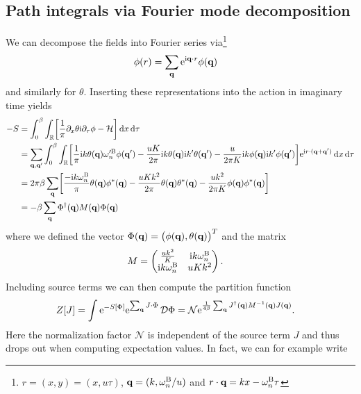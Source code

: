 \documentclass[english, parskip=full]{scrartcl}
\begin{document}
\subsection{Path integrals via Fourier mode decomposition}
We can decompose the fields into Fourier series via\footnote{$r=(x,y) = (x,u\tau)$, $\textbf{q} = (k,\omega_n^\B / u)$ and $r\cdot \textbf{q} = kx - \omega_n^\B \tau$}
\begin{align}
\phi(r) &= \sum_\textbf{q} \powe{\i \textbf{q}\cdot r} \phi(\textbf{q})
\end{align}
and similarly for $\theta$.
Inserting these representations into the action in imaginary time yields
\begin{align}
-S &= \intx{0}{\beta}{\intr{\klb*{\frac{1}{\pi} \partial_x\theta \i\partial_\tau\phi - \mathcal{H}}}{x} }{\tau}\\
&= \sum_{\textbf{q},\textbf{q}'} \intx{0}{\beta}{\intr{\klb*{\frac{1}{\pi} \i k\theta(\textbf{q}) \omega_n'^\B \phi(\textbf{q}') - \frac{uK}{2\pi} \i k\theta(\textbf{q}) \i k'\theta(\textbf{q}') - \frac{u}{2\pi K} \i k\phi(\textbf{q}) \i k' \phi(\textbf{q}')} \powe{\i r\cdot (\textbf{q} + \textbf{q}')}}{x} }{\tau}\\
&= 2\pi\beta\sum_\textbf{q} \klb*{\frac{-\i k\omega_n^\B}{\pi} \theta(\textbf{q}) \phi^\ast(\textbf{q}) - \frac{uKk^2}{2\pi} \theta(\textbf{q}) \theta^\ast(\textbf{q}) - \frac{uk^2}{2\pi K} \phi(\textbf{q}) \phi^\ast(\textbf{q})}\\
&= -\beta \sum_\textbf{q} \Phi^\dagger(\textbf{q}) M(\textbf{q}) \Phi(\textbf{q})
\end{align}
where we defined the vector $\Phi(\textbf{q}) = \kla[\big]{\phi(\textbf{q}), \theta(\textbf{q})}^T$ and the matrix
\begin{align}
M &= \begin{pmatrix}
\frac{uk^2}{K} & \i k\omega_n^\B \\ \i k\omega_n^\B & uKk^2
\end{pmatrix}.
\end{align}
Including source terms we can then compute the partition function
\begin{align}
Z[J] &= \int \powe{-S[\Phi]} \powe{\sum_\textbf{q} J\cdot \Phi} \,\mathcal{D}\Phi = \mathcal{N} \powe{\frac{1}{4\beta} \sum_\textbf{q} J^\dagger(\textbf{q}) M^{-1}(\textbf{q}) J(\textbf{q})}.
\end{align}
Here the normalization factor $\mathcal{N}$ is independent of the source term $J$ and thus drops out when computing expectation values.
In fact, we can for example write
\end{document}
